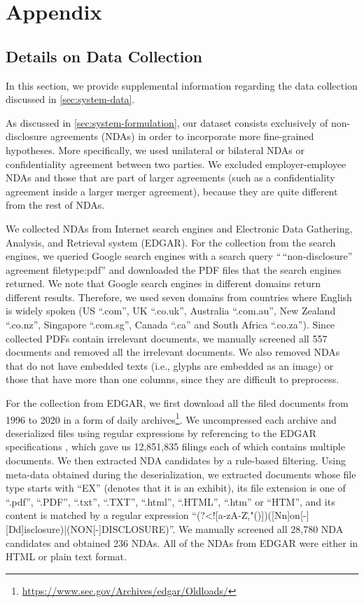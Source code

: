 \clearpage

\section{Appendix}\label{sec:appendix}



\subsection{Details on Data Collection}\label{sec:appendix-data-collection}

In this section, we provide supplemental information regarding the data collection discussed in \cref{sec:system-data}.

As discussed in \cref{sec:system-formulation}, our dataset consists exclusively of non-disclosure agreements (NDAs) in order to incorporate more fine-grained hypotheses.
More specifically, we used unilateral or bilateral NDAs or confidentiality agreement between two parties.
We excluded employer-employee NDAs and those that are part of larger agreements (such as a confidentiality agreement inside a larger merger agreement), because they are quite different from the rest of NDAs.

We collected NDAs from Internet search engines and Electronic Data Gathering, Analysis, and Retrieval system (EDGAR).
For the collection from the search engines, we queried Google search engines with a search query ``\,``non-disclosure'' agreement filetype:pdf'' and downloaded the PDF files that the search engines returned.
We note that Google search engines in different domains return different results.
Therefore, we used seven domains from countries where English is widely spoken (US ``.com'', UK ``.co.uk'', Australia ``.com.au'', New Zealand ``.co.nz'', Singapore ``.com.sg'', Canada ``.ca'' and South Africa ``.co.za'').
Since collected PDFs contain irrelevant documents, we manually screened all 557 documents and removed all the irrelevant documents.
We also removed NDAs that do not have embedded texts (i.e., glyphs are embedded as an image) or those that have more than one columns, since they are difficult to preprocess.

For the collection from EDGAR, we first download all the filed documents from 1996 to 2020 in a form of daily archives\footnote{\url{https://www.sec.gov/Archives/edgar/Oldloads/}}.
We uncompressed each archive and deserialized files using regular expressions by referencing to the EDGAR specifications \cite{sec_edgar_2018}, which gave us 12,851,835 filings each of which contains multiple documents.
We then extracted NDA candidates by a rule-based filtering.
Using meta-data obtained during the deserialization, we extracted documents whose file type starts with ``EX'' (denotes that it is an exhibit), its file extension is one of ``.pdf'', ``.PDF'', ``.txt'', ``.TXT'', ``.html'', ``.HTML'', ``.htm'' or ``HTM'', and its content is matched by a regular expression ``(?<![a-zA-Z\.,\-"()]\textvisiblespace*)([Nn]on[-\textvisiblespace][Dd]isclosure)|(NON[-\textvisiblespace]DISCLOSURE)''.
We manually screened all 28,780 NDA candidates and obtained 236 NDAs.
All of the NDAs from EDGAR were either in HTML or plain text format.

